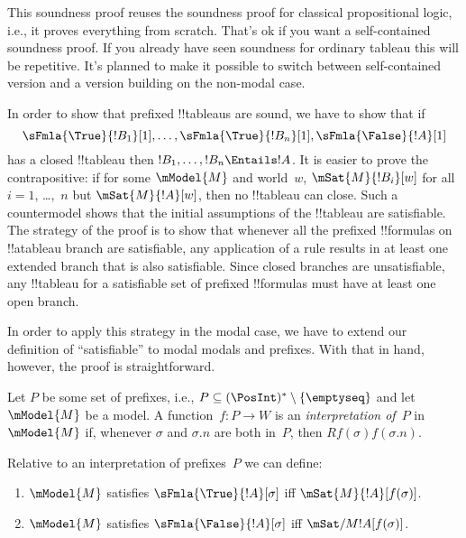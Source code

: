 \documentclass[../../../include/open-logic-section]{subfiles}
\begin{document}

\begin{editorial}
  This soundness proof reuses the soundness proof for classical
  propositional logic, i.e., it proves everything from scratch. That's
  ok if you want a self-contained soundness proof. If you already have
  seen soundness for ordinary tableau this will be repetitive. It's
  planned to make it possible to switch between self-contained version
  and a version building on the non-modal case.
\end{editorial}

\begin{explain}
  In order to show that prefixed !!{tableau}s are sound, we have to
  show that if
  \[
  \sFmla{\True}{!B_1}[1], \dots, \sFmla{\True}{!B_n}[1], \sFmla{\False}{!A}[1]
  \]
  has a closed !!{tableau} then $!B_1, \dots, !B_n \Entails !A$. It is
  easier to prove the contrapositive: if for some $\mModel{M}$ and
  world~$w$, $\mSat{M}{!B_i}[w]$ for all $i=1$, \dots,~$n$ but
  $\mSat{M}{!A}[w]$, then no !!{tableau} can close. Such a
  countermodel shows that the initial assumptions of the !!{tableau}
  are satisfiable. The strategy of the proof is to show that whenever
  all the prefixed !!{formula}s on !!a{tableau} branch are
  satisfiable, any application of a rule results in at least one
  extended branch that is also satisfiable. Since closed branches are
  unsatisfiable, any !!{tableau} for a satisfiable set of prefixed
  !!{formula}s must have at least one open branch.

  In order to apply this strategy in the modal case, we have to extend
  our definition of ``satisfiable'' to modal modals and prefixes. With
  that in hand, however, the proof is straightforward.
\end{explain}

\begin{defn}
  Let $P$ be some set of prefixes, i.e., $P \subseteq (\PosInt)^*
  \setminus \{\emptyseq\}$ and let $\mModel{M}$ be a model.  A
  function~$f\colon P \to W$ is an \emph{interpretation of}~$P$
  in~$\mModel{M}$ if, whenever $\sigma$ and $\sigma.n$ are both
  in~$P$, then $Rf(\sigma)f(\sigma.n)$.

  Relative to an interpretation of prefixes~$P$ we can define:
  \begin{enumerate}
  \item $\mModel{M}$ satisfies $\sFmla{\True}{!A}[\sigma]$ iff
    $\mSat{M}{!A}[f(\sigma)]$.
  \item $\mModel{M}$ satisfies $\sFmla{\False}{!A}[\sigma]$ iff
    $\mSat/{M}{!A}[f(\sigma)]$.
  \end{enumerate}
\end{defn}
\end{document}
